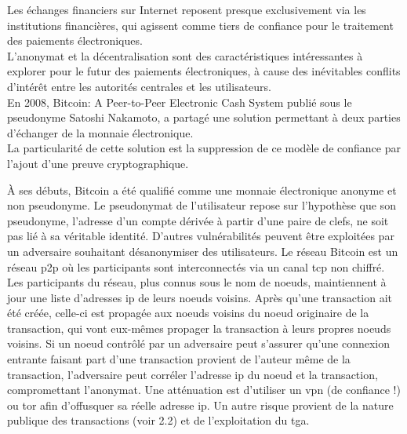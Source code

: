 \noindent
Les échanges financiers sur Internet reposent presque exclusivement via les institutions 
financières, qui agissent comme tiers de confiance pour le traitement des paiements 
électroniques.\\
L'anonymat et la décentralisation sont des caractéristiques intéressantes à explorer
pour le futur des paiements électroniques, à cause des inévitables conflits d'intérêt 
entre les autorités centrales et les utilisateurs.\\
En 2008, \og Bitcoin\cite{bitcoin_wp}: A Peer-to-Peer Electronic Cash System \fg publié 
sous le pseudonyme Satoshi Nakamoto, a partagé une solution permettant à deux parties 
d'échanger de la monnaie électronique.\\
La particularité de cette solution est la suppression de ce modèle de confiance 
par l'ajout d'une preuve cryptographique.

\bigskip

À ses débuts, Bitcoin a été qualifié comme une monnaie électronique \og anonyme \fg
et non pseudonyme.
Le pseudonymat de l'utilisateur repose sur l'hypothèse que son pseudonyme, 
l'adresse d'un compte dérivée à partir d'une paire de clefs, ne soit pas lié à sa 
véritable identité.
D'autres vulnérabilités peuvent être exploitées par un adversaire souhaitant désanonymiser 
des utilisateurs. Le réseau Bitcoin est un réseau \acrshort{p2p} où les participants 
sont interconnectés via un canal \acrshort{tcp} non chiffré. Les participants du réseau, plus connus 
sous le nom de noeuds, maintiennent à jour une liste d'adresses \acrshort{ip} de leurs noeuds voisins. 
Après qu'une transaction ait été créée, celle-ci est propagée aux noeuds voisins du noeud 
originaire de la transaction, qui vont eux-mêmes propager la transaction à leurs propres 
noeuds voisins. Si un noeud contrôlé par un adversaire peut s'assurer qu'une connexion entrante 
faisant part d'une transaction provient de l'auteur même de la transaction, l'adversaire peut
corréler l'adresse \acrshort{ip} du noeud et la transaction, compromettant l'anonymat.
Une atténuation est d'utiliser un \acrshort{vpn} (de confiance !) ou \acrshort{tor} afin d'offusquer sa 
réelle adresse \acrshort{ip}.
Un autre risque provient de la nature publique des transactions (voir 2.2) et de
l'exploitation du \acrshort{tga}.

\bigskip

